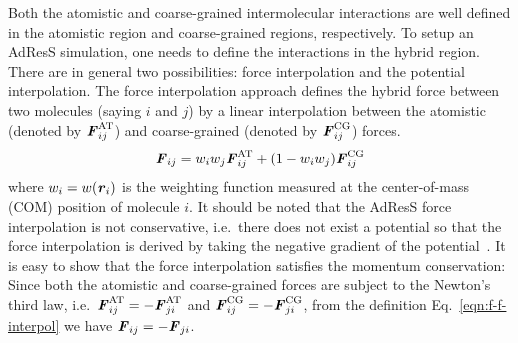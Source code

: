 \documentclass[epjST]{svjour}
\newcommand{\vect}[1]{\textbf{\textit{#1}}}
\newcommand{\AT}[0]{\textrm{AT}}
\newcommand{\CG}[0]{\textrm{CG}}
\newcommand{\moleidxone}[0]{i}
\newcommand{\moleidxtwo}[0]{j}
\begin{document}
Both the atomistic and coarse-grained intermolecular interactions are
well defined in the atomistic region and coarse-grained regions,
respectively.  To setup an AdResS simulation, one needs to define the
interactions in the hybrid region. There are in general two
possibilities: force interpolation and the potential interpolation.
The force interpolation approach defines the hybrid force between two
molecules (saying $\moleidxone$ and $\moleidxtwo$) by a linear interpolation
between the atomistic (denoted by ${\vect F}_{\moleidxone\moleidxtwo}^{\AT}$) and coarse-grained (denoted by ${\vect F}_{\moleidxone\moleidxtwo}^{\CG}$) forces.
\begin{align}\label{eqn:f-f-interpol}
  {\vect F}_{\moleidxone \moleidxtwo}=w_\moleidxone w_\moleidxtwo{\vect F}_{\moleidxone\moleidxtwo}^{\AT}+(1-w_\moleidxone w_\moleidxtwo){\vect F}^{\CG}_{\moleidxone\moleidxtwo} 
\end{align}
where $w_\moleidxone = w(\vect r_\moleidxone)$ is the weighting function
measured at the center-of-mass (COM) position of molecule $\moleidxone$.
It should be noted that the AdResS  force interpolation is not conservative, i.e.~there does not
exist a potential so that the force interpolation is derived by taking the negative gradient of the potential~\cite{praprotnik2011comment,dellesite2007some}.
It is easy to show that the force interpolation satisfies the momentum conservation: Since
both the atomistic and coarse-grained forces are subject to the Newton's third law, i.e.~${\vect F}_{\moleidxone\moleidxtwo}^{\AT} = - {\vect F}_{\moleidxtwo\moleidxone}^{\AT}$
and ${\vect F}_{\moleidxone\moleidxtwo}^{\CG} = - {\vect F}_{\moleidxtwo\moleidxone}^{\CG}$, from the definition Eq.~\eqref{eqn:f-f-interpol} we have ${\vect F}_{\moleidxone\moleidxtwo} = - {\vect F}_{\moleidxtwo\moleidxone}$.
\end{document}
